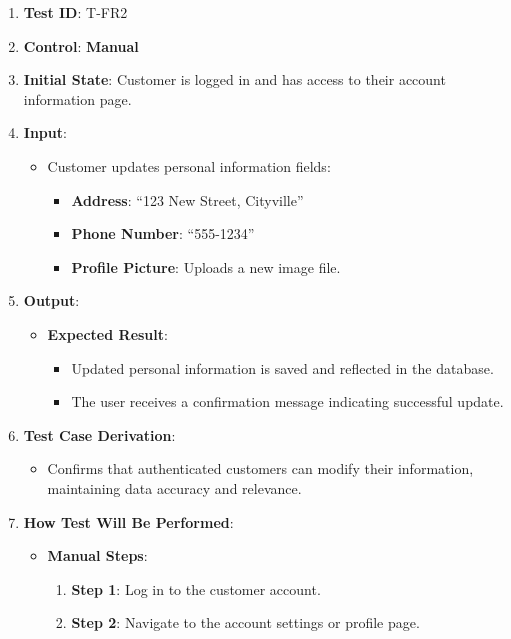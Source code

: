 \documentclass[12pt, titlepage]{article}
\begin{document}
\begin{enumerate}
    \item \textbf{Test ID}: T-FR2
    \item \textbf{Control}: \textbf{Manual}
    \item \textbf{Initial State}: Customer is logged in and has access to their account information page.
    \item \textbf{Input}:
    \begin{itemize}
        \item Customer updates personal information fields:
        \begin{itemize}
            \item \textbf{Address}: ``123 New Street, Cityville''
            \item \textbf{Phone Number}: ``555-1234''
            \item \textbf{Profile Picture}: Uploads a new image file.
        \end{itemize}
    \end{itemize}
    \item \textbf{Output}:
    \begin{itemize}
        \item \textbf{Expected Result}:
        \begin{itemize}
            \item Updated personal information is saved and reflected in the database.
            \item The user receives a confirmation message indicating successful update.
        \end{itemize}
    \end{itemize}
    \item \textbf{Test Case Derivation}:
    \begin{itemize}
        \item Confirms that authenticated customers can modify their information, maintaining data accuracy and relevance.
    \end{itemize}
    \item \textbf{How Test Will Be Performed}:
    \begin{itemize}
        \item \textbf{Manual Steps}:
        \begin{enumerate}
            \item \textbf{Step 1}: Log in to the customer account.
            \item \textbf{Step 2}: Navigate to the account settings or profile page.

\end{enumerate}
\end{itemize}
\end{enumerate}
\end{document}
